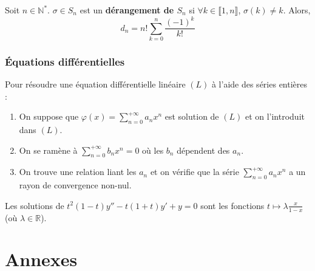 
	\begin{application}
		Soit $n \in \mathbb{N}^*$. $\sigma \in S_n$ est un \textbf{dérangement de $S_n$} si $\forall k \in \llbracket 1, n \rrbracket$, $\sigma(k) \neq k$.
		Alors,
		\[ d_n = n! \sum_{k=0}^n \frac{(-1)^k}{k!} \]
	\end{application}

	\subsubsection{Équations différentielles}


	\begin{proposition}
		Pour résoudre une équation différentielle linéaire $(L)$ à l'aide des séries entières :
		\begin{enumerate}[label=(\roman*)]
			\item On suppose que $\varphi(x) = \sum_{n=0}^{+\infty} a_n x^n$ est solution de $(L)$ et on l'introduit dans $(L)$.
			\item On se ramène à $\sum_{n=0}^{+\infty} b_nx^n = 0$ où les $b_n$ dépendent des $a_n$.
			\item On trouve une relation liant les $a_n$ et on vérifie que la série $\sum_{n=0}^{+\infty} a_n x^n$ a un rayon de convergence non-nul.
		\end{enumerate}
	\end{proposition}


	\begin{example}
		Les solutions de $t^2 (1-t) y'' - t (1+t) y' + y = 0$ sont les fonctions $t \mapsto \lambda \frac{x}{1-x}$ (où $\lambda \in \mathbb{R}$).
	\end{example}

	\newpage
	\section*{Annexes}


